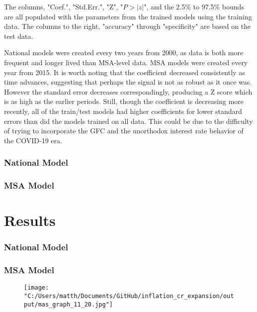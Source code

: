 The columns, "Coef.", "Std.Err.", "Z", "$P>|z|$", and the 2.5\% to 97.5\% bounds are all populated with the parameters from the trained models using the training data. The columns to the right, "accuracy" through "specificity" are based on the test data. 

National models were created every two years from 2000, as data is both more frequent and longer lived than MSA-level data. MSA models were created every year from 2015. It is worth noting that the coefficient decreased consistently as time advances, suggesting that perhaps the signal is not as robust as it once was. However the standard error decreases correspondingly, producing a Z score which is as high as the earlier periods. Still, though the coefficient is decreasing more recently, all of the train/test models had higher coefficients for lower standard errors than did the models trained on all data. This could be due to the difficulty of trying to incorporate the GFC and the unorthodox interest rate behavior of the COVID-19 era. 

\subsubsection{National Model}

\subsubsection{MSA Model}

\section{Results}


\subsubsection{National Model}

\subsubsection{MSA Model}
\begin{figure}
\texttt{[image: "C:/Users/matth/Documents/GitHub/inflation\_cr\_expansion/output/mas\_graph\_11\_20.jpg"]}
\end{figure}


